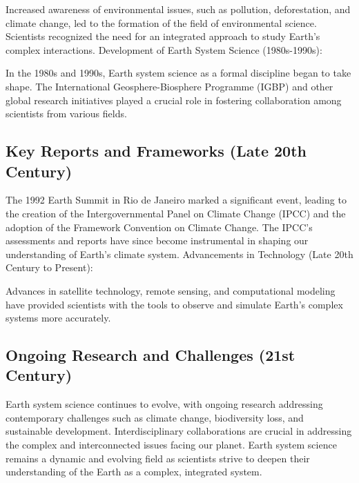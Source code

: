 \documentclass{tufte-handout}\usepackage[]{graphicx}\usepackage[]{xcolor}
\begin{document}
Increased awareness of environmental issues, such as pollution, deforestation, and climate change, led to the formation of the field of environmental science. Scientists recognized the need for an integrated approach to study Earth's complex interactions.
Development of Earth System Science (1980s-1990s):

In the 1980s and 1990s, Earth system science as a formal discipline began to take shape. The International Geosphere-Biosphere Programme (IGBP) and other global research initiatives played a crucial role in fostering collaboration among scientists from various fields.


\subsection{Key Reports and Frameworks (Late 20th Century)}

The 1992 Earth Summit in Rio de Janeiro marked a significant event, leading to the creation of the Intergovernmental Panel on Climate Change (IPCC) and the adoption of the Framework Convention on Climate Change. The IPCC's assessments and reports have since become instrumental in shaping our understanding of Earth's climate system.
Advancements in Technology (Late 20th Century to Present):

Advances in satellite technology, remote sensing, and computational modeling have provided scientists with the tools to observe and simulate Earth's complex systems more accurately.


\subsection{Ongoing Research and Challenges (21st Century)}

Earth system science continues to evolve, with ongoing research addressing contemporary challenges such as climate change, biodiversity loss, and sustainable development. Interdisciplinary collaborations are crucial in addressing the complex and interconnected issues facing our planet.
Earth system science remains a dynamic and evolving field as scientists strive to deepen their understanding of the Earth as a complex, integrated system.
\end{document}
